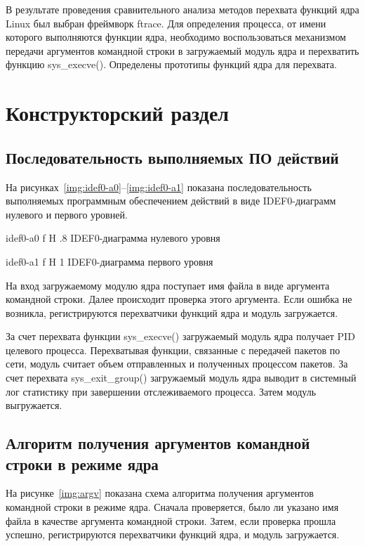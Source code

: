 \documentclass{bmstu}
\begin{document}
В результате проведения сравнительного анализа методов перехвата функций ядра Linux был выбран фреймворк ftrace. 
Для определения процесса, от имени которого выполняются функции ядра, необходимо воспользоваться механизмом передачи аргументов командной строки в загружаемый модуль ядра и перехватить функцию sys\_execve(). 
Определены прототипы функций ядра для перехвата.

\chapter{Конструкторский раздел}

\section{Последовательность выполняемых ПО действий}

На рисунках~\ref{img:idef0-a0}--\ref{img:idef0-a1} показана последовательность выполняемых программным обеспечением действий в виде IDEF0-диаграмм нулевого и первого уровней.

    {idef0-a0}
    {f}
    {H}
    {.8\textwidth}
    {IDEF0-диаграмма нулевого уровня}
    
    {idef0-a1}
    {f}
    {H}
    {1\textwidth}
    {IDEF0-диаграмма первого уровня}

На вход загружаемому модулю ядра поступает имя файла в виде аргумента командной строки. 
Далее происходит проверка этого аргумента. 
Если ошибка не возникла, регистрируются перехватчики функций ядра и модуль загружается.

За счет перехвата функции sys\_execve() загружаемый модуль ядра получает PID целевого процесса. 
Перехватывая функции, связанные с передачей пакетов по сети, модуль считает объем отправленных и полученных процессом пакетов. 
За счет перехвата sys\_exit\_group() загружаемый модуль ядра выводит в системный лог статистику при завершении отслеживаемого процесса. 
Затем модуль выгружается.

\section{Алгоритм получения аргументов командной строки в режиме ядра}

На рисунке~\ref{img:argv} показана схема алгоритма получения аргументов командной строки в режиме ядра. 
Сначала проверяется, было ли указано имя файла в качестве аргумента командной строки. 
Затем, если проверка прошла успешно, регистрируются перехватчики функций ядра, и модуль загружается.
\end{document}
